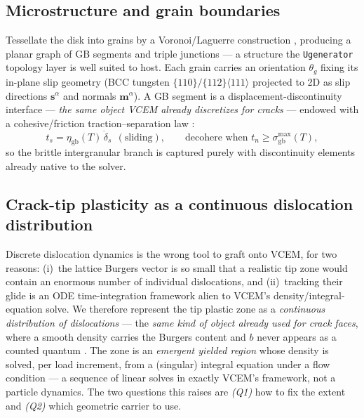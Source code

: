 \documentclass[11pt]{article}
\begin{document}
\subsection{Microstructure and grain boundaries}
Tessellate the disk into grains by a Voronoi/Laguerre construction
\citep{voronoi_okabe2000}, producing a planar graph of GB segments and triple
junctions --- a structure the \texttt{Ugenerator} topology layer is well suited
to host. Each grain carries an orientation $\theta_g$ fixing its in-plane slip
geometry (BCC tungsten $\{110\}/\{112\}\langle111\rangle$ projected to 2D as
slip directions $\mathbf s^{\alpha}$ and normals $\mathbf m^{\alpha}$). A GB
segment is a displacement-discontinuity interface --- \emph{the same object
VCEM already discretizes for cracks} --- endowed with a cohesive/friction
traction--separation law \citep{xu_needleman1994,raj_ashby1971}:
\begin{equation}
t_s = \eta_{\mathrm{gb}}(T)\,\dot\delta_s \ \ (\text{sliding}),
\qquad
\text{decohere when } t_n \ge \sigma_{\mathrm{gb}}^{\max}(T),
\label{eq:gb}
\end{equation}
so the brittle intergranular branch is captured purely with discontinuity
elements already native to the solver.

\subsection{Crack-tip plasticity as a continuous dislocation distribution}
\label{sec:croacktip}

Discrete dislocation dynamics is the wrong tool to graft onto VCEM, for two
reasons: (i)~the lattice Burgers vector is so small that a realistic tip zone
would contain an enormous number of individual dislocations, and (ii)~tracking
their glide is an ODE time-integration framework alien to VCEM's
density/integral-equation solve. We therefore represent the tip plastic zone as
a \emph{continuous distribution of dislocations} --- the \emph{same kind of
object already used for crack faces}, where a smooth density carries the Burgers
content and $b$ never appears as a counted quantum
\citep{bilby1968,hills1996ddt,bcs1963,weertman1996,lardner1974}. The zone is an
\emph{emergent yielded region} whose density is solved, per load increment, from
a (singular) integral equation under a flow condition --- a sequence of linear
solves in exactly VCEM's framework, not a particle dynamics. The two questions
this raises are \emph{(Q1)} how to fix the extent and \emph{(Q2)} which
geometric carrier to use.
\end{document}
